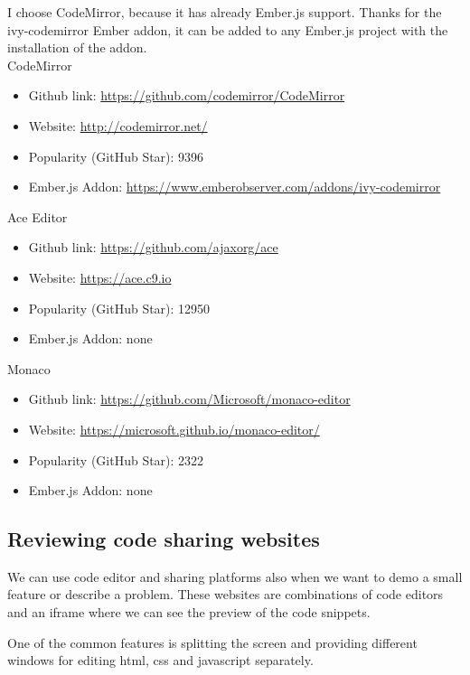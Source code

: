 I choose CodeMirror, because it has already Ember.js support. Thanks for
the ivy-codemirror Ember addon, it can be added to any Ember.js project
with the installation of the addon.\\
CodeMirror

\begin{itemize}
\item
  Github link: \url{https://github.com/codemirror/CodeMirror}
\item
  Website: \url{http://codemirror.net/}
\item
  Popularity (GitHub Star): 9396
\item
  Ember.js Addon:
  \url{https://www.emberobserver.com/addons/ivy-codemirror}\\
\end{itemize}

Ace Editor

\begin{itemize}
\item
  Github link: \url{https://github.com/ajaxorg/ace}
\item
  Website: \url{https://ace.c9.io}
\item
  Popularity (GitHub Star): 12950
\item
  Ember.js Addon: none
\end{itemize}

Monaco

\begin{itemize}
\item
  Github link: \url{https://github.com/Microsoft/monaco-editor}
\item
  Website: \url{https://microsoft.github.io/monaco-editor/}
\item
  Popularity (GitHub Star): 2322
\item
  Ember.js Addon: none
\end{itemize}

\subsection{Reviewing code sharing
websites}\label{reviewing-code-sharing-websites}

We can use code editor and sharing platforms also when we want to demo a
small feature or describe a problem. These websites are combinations of
code editors and an iframe where we can see the preview of the code
snippets.

One of the common features is splitting the screen and providing
different windows for editing html, css and javascript separately.

